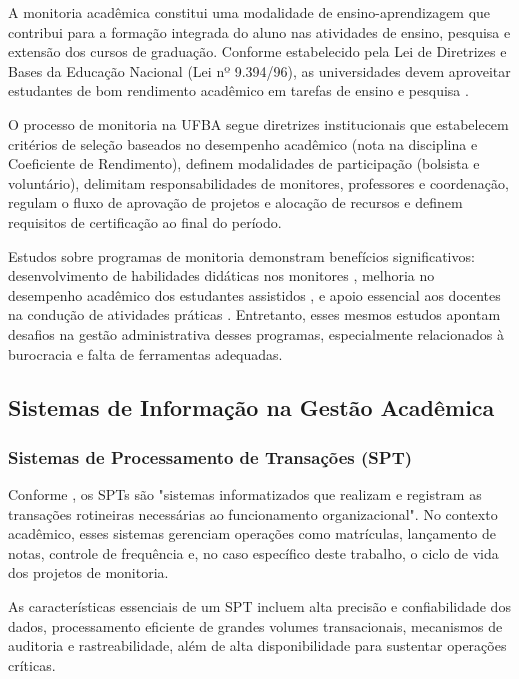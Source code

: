 \documentclass[portuguese]{sbc2025}%
\begin{document}
A monitoria acadêmica constitui uma modalidade de ensino-aprendizagem que contribui para a formação integrada do aluno nas atividades de ensino, pesquisa e extensão dos cursos de graduação. Conforme estabelecido pela Lei de Diretrizes e Bases da Educação Nacional (Lei nº 9.394/96), as universidades devem aproveitar estudantes de bom rendimento acadêmico em tarefas de ensino e pesquisa \cite{Brasil1996}.

O processo de monitoria na UFBA segue diretrizes institucionais que estabelecem critérios de seleção baseados no desempenho acadêmico (nota na disciplina e Coeficiente de Rendimento), definem modalidades de participação (bolsista e voluntário), delimitam responsabilidades de monitores, professores e coordenação, regulam o fluxo de aprovação de projetos e alocação de recursos e definem requisitos de certificação ao final do período.

Estudos sobre programas de monitoria demonstram benefícios significativos: desenvolvimento de habilidades didáticas nos monitores \cite{Natario2010}, melhoria no desempenho acadêmico dos estudantes assistidos \cite{Frison2016}, e apoio essencial aos docentes na condução de atividades práticas \cite{Dantas2014}. Entretanto, esses mesmos estudos apontam desafios na gestão administrativa desses programas, especialmente relacionados à burocracia e falta de ferramentas adequadas.

\subsection{Sistemas de Informação na Gestão Acadêmica}

\subsubsection{Sistemas de Processamento de Transações (SPT)}

Conforme \cite{Laudon_Laudon_2011}, os SPTs são "sistemas informatizados que realizam e registram as transações rotineiras necessárias ao funcionamento organizacional". No contexto acadêmico, esses sistemas gerenciam operações como matrículas, lançamento de notas, controle de frequência e, no caso específico deste trabalho, o ciclo de vida dos projetos de monitoria.

As características essenciais de um SPT incluem alta precisão e confiabilidade dos dados, processamento eficiente de grandes volumes transacionais, mecanismos de auditoria e rastreabilidade, além de alta disponibilidade para sustentar operações críticas.
\end{document}
